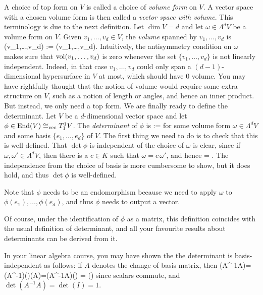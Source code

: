 \bd
A choice of top form on $V$ is called a choice of \emph{volume form} on $V$. A vector space with a chosen volume form is then called a \emph{vector space with volume}.
\ed
This terminology is due to the next definition.
\bd
Let $\dim V = d$ and let $\omega \in \Lambda^dV$ be a volume form on $V$. Given $v_1,\ldots,v_d\in V$, the \emph{volume} spanned by $v_1,\ldots,v_d$ is
\bse
\vol(v_1,\ldots,v_d) := \omega(v_1,\ldots,v_d).
\ese
\ed
Intuitively, the antisymmetry condition on $\omega$ makes sure that $\operatorname{vol}(v_1,\ldots,v_d)$ is zero whenever the set $\{v_1,\ldots,v_d\}$ is not linearly independent. Indeed, in that case $v_1,\ldots,v_d$ could only span a $(d-1)$-dimensional hypersurface in $V$ at most, which should have $0$ volume. 
\br
You may have rightfully thought that the notion of volume would require some extra structure on $V$, such as a notion of length or angles, and hence an inner product. But instead, we only need a top form.
\er
We are finally ready to define the determinant.
\bd
Let $V$ be a $d$-dimensional vector space and let $\phi \in \operatorname{End} (V) \cong_\mathrm{vec}T^1_1V$. The \emph{determinant} of $\phi$ is
\bse
\det \phi := 
\ese
for some volume form $\omega \in \Lambda^dV$ and some basis $\{e_1,\ldots,e_d\}$ of $V$.
\ed
The first thing we need to do is to check that this is well-defined. That $\det \phi$ is independent of the choice of $\omega$ is clear, since if $\omega,\omega' \in \Lambda^dV$, then there is a $c \in K$ such that $\omega = c\, \omega'$, and hence 
\bse
  =  .
\ese
The independence from the choice of basis is more cumbersome to show, but it does hold, and thus $\det \phi$ is well-defined.

Note that $\phi$ needs to be an endomorphism because we need to apply $\omega$ to $\phi(e_1),\ldots,\phi(e_d)$, and thus $\phi$ needs to output a vector.

Of course, under the identification of $\phi$ as a matrix, this definition coincides with the usual definition of determinant, and all your favourite results about determinants can be derived from it. 

\br
In your linear algebra course, you may have shown the the determinant is basis-independent as follows: if $A$ denotes the change of basis matrix, then
\bse
\det(A^{-1}\phi A)=\det(A^{-1})\det(\phi)\det(A)=\det(A^{-1}A)\det(\phi) = \det(\phi)
\ese
since scalars commute, and $\det(A^{-1}A)=\det(I)=1$.


